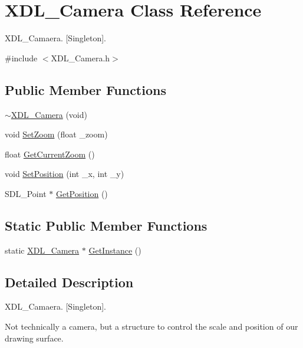 \hypertarget{class_x_d_l___camera}{\section{X\-D\-L\-\_\-\-Camera Class Reference}
\label{class_x_d_l___camera}
}


X\-D\-L\-\_\-\-Camaera. \mbox{[}Singleton\mbox{]}.  




{\ttfamily \#include $<$X\-D\-L\-\_\-\-Camera.\-h$>$}

\subsection*{Public Member Functions}
\begin{DoxyCompactItemize}
\item 
\hyperlink{class_x_d_l___camera_aeca108c3495c9fca85f150932ee77eae}{$\sim$\-X\-D\-L\-\_\-\-Camera} (void)
\item 
void \hyperlink{class_x_d_l___camera_a4a973ddf2f7ab261f8bbaec4a911ba5e}{Set\-Zoom} (float \-\_\-zoom)
\item 
float \hyperlink{class_x_d_l___camera_afb54ec9b1efa5cf23faea192a63d8d44}{Get\-Current\-Zoom} ()
\item 
void \hyperlink{class_x_d_l___camera_a95e3e2c8dbbcaba8d9a6f572f1c0919d}{Set\-Position} (int \-\_\-x, int \-\_\-y)
\item 
S\-D\-L\-\_\-\-Point $\ast$ \hyperlink{class_x_d_l___camera_aaf2329b5bed3bdd0f679f3ce39d7aa89}{Get\-Position} ()
\end{DoxyCompactItemize}
\subsection*{Static Public Member Functions}
\begin{DoxyCompactItemize}
\item 
static \hyperlink{class_x_d_l___camera}{X\-D\-L\-\_\-\-Camera} $\ast$ \hyperlink{class_x_d_l___camera_af972e4ad4d82db12161f0b3c0234f279}{Get\-Instance} ()
\end{DoxyCompactItemize}


\subsection{Detailed Description}
X\-D\-L\-\_\-\-Camaera. \mbox{[}Singleton\mbox{]}. 

Not technically a camera, but a structure to control the scale and position of our drawing surface. 

